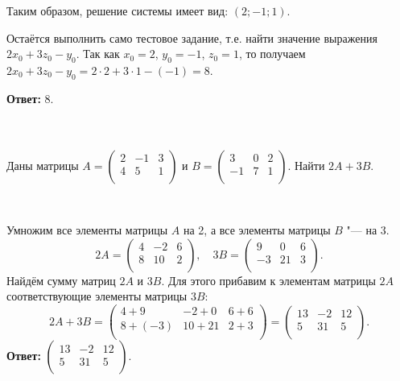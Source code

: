 \documentclass[10pt]{article}
\numberwithin{primer}{section}
\numberwithin{equation}{section}
\begin{document}
Таким образом, решение системы имеет вид: $\left(2;-1;1\right)$.

Остаётся выполнить само тестовое задание, т.е. найти значение выражения $2x_0+3z_0-y_0$. Так как $x_0=2$, $y_0=-1$, $z_0=1$, то
получаем $2x_0+3z_0-y_0=2\cdot2+3\cdot1-(-1)=8$.

\noindent\textbf{Ответ: }8.\vspace{4pt}

\noindent\hrulefill\,\,\hrulefill\\

\vspace*{-0.5cm}\noindent{}\vspace{4pt}\\
Даны матрицы $A=\begin{pmatrix}
2 & -1 & 3\\
4 & 5 & 1\\
\end{pmatrix}$ и $B=\begin{pmatrix}
3 & 0 & 2\\
-1 & 7 & 1\\
\end{pmatrix}$. Найти $2A+3B$.

\noindent{}\,\hrulefill\vspace{4pt}

Умножим все элементы матрицы $A$ на 2, а все элементы матрицы $B$ "--- на 3.
\begin{equation*}
2A=\begin{pmatrix}
4 & -2 & 6\\
8 & 10 & 2\\
\end{pmatrix},\quad
3B=\begin{pmatrix}
9 & 0 & 6\\
-3 & 21 & 3\\
\end{pmatrix}.
\end{equation*}
Найдём сумму матриц $2A$ и $3B$. Для этого прибавим к элементам матрицы $2A$ соответствующие элементы матрицы
$3B$:
\begin{equation*}
2A+3B=\begin{pmatrix}
4+9 & -2+0 & 6+6\\
8+(-3) & 10+21 & 2+3\\
\end{pmatrix}=
\begin{pmatrix}
13 & -2 & 12\\
5 & 31 & 5\\
\end{pmatrix}.
\end{equation*}
\noindent\textbf{Ответ: }$\begin{pmatrix}
13 & -2 & 12\\
5 & 31 & 5\\
\end{pmatrix}$.\vspace{4pt}
\end{document}
